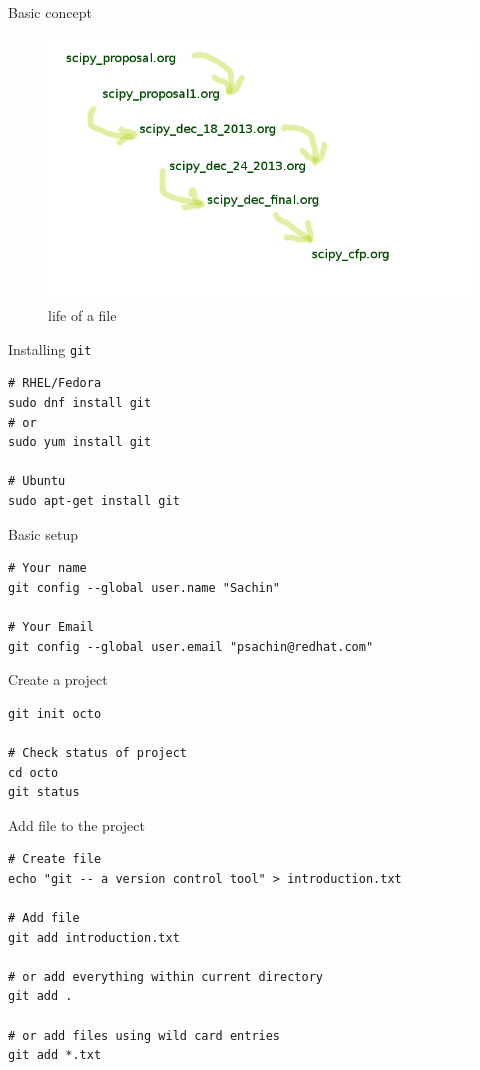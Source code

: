\documentclass[10pt]{beamer}
\begin{document}
\begin{frame}[label={sec:org3902933}]{Basic concept}
\begin{figure}[htbp]
\centering
\includegraphics[width=.9\linewidth]{./concept.png}
\caption{\label{fig:orga33f18a}
life of a file}
\end{figure}
\end{frame}

\begin{frame}[fragile,label={sec:orgc99e35d}]{Installing \texttt{git}}
 \begin{verbatim}
# RHEL/Fedora
sudo dnf install git
# or
sudo yum install git

# Ubuntu
sudo apt-get install git
\end{verbatim}
\end{frame}


\begin{frame}[fragile,label={sec:org1b7d10e}]{Basic setup}
 \begin{verbatim}
# Your name
git config --global user.name "Sachin"

# Your Email
git config --global user.email "psachin@redhat.com"
\end{verbatim}
\end{frame}


\begin{frame}[fragile,label={sec:org81ff28c}]{Create a project}
 \begin{verbatim}
git init octo

# Check status of project
cd octo
git status
\end{verbatim}
\end{frame}

\begin{frame}[fragile,label={sec:orga3c2b16}]{Add file to the project}
 \begin{verbatim}
# Create file
echo "git -- a version control tool" > introduction.txt

# Add file
git add introduction.txt

# or add everything within current directory
git add .

# or add files using wild card entries
git add *.txt
\end{verbatim}
\end{frame}
\end{document}
